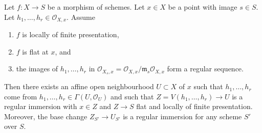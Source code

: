 \begin{lemma}
\label{lemma-slice-given-elements}
Let $f : X \to S$ be a morphism of schemes.
Let $x \in X$ be a point with image $s \in S$.
Let $h_1, \ldots, h_r \in \mathcal{O}_{X, x}$.
Assume
\begin{enumerate}
\item $f$ is locally of finite presentation,
\item $f$ is flat at $x$, and
\item the images of $h_1, \ldots, h_r$ in
$\mathcal{O}_{X_s, x} = \mathcal{O}_{X, x}/\mathfrak m_s\mathcal{O}_{X, x}$
form a regular sequence.
\end{enumerate}
Then there exists an affine open neighbourhood $U \subset X$ of $x$
such that $h_1, \ldots, h_r$ come from
$h_1, \ldots, h_r \in \Gamma(U, \mathcal{O}_U)$ and such
that $Z = V(h_1, \ldots, h_r) \to U$ is a regular immersion with
$x \in Z$ and $Z \to S$ flat and locally of finite presentation.
Moreover, the base change $Z_{S'} \to U_{S'}$ is a regular immersion
for any scheme $S'$ over $S$.
\end{lemma}

